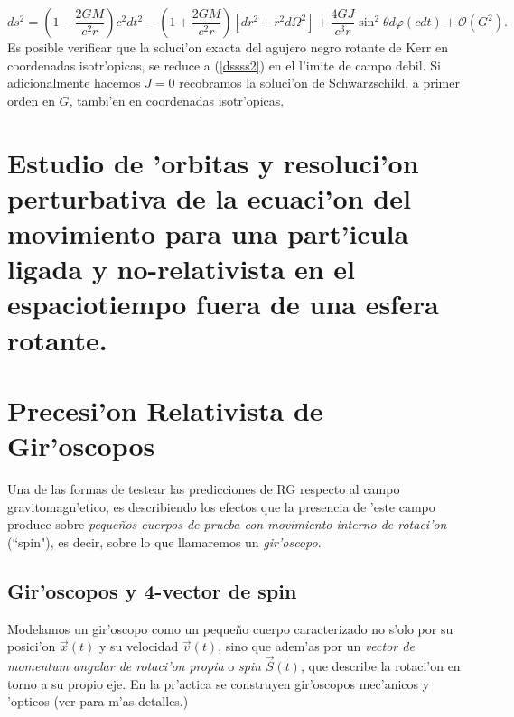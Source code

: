 \begin{equation}\boxed{
ds^2=\left(1-\frac{2GM}{c^2r}\right)c^2dt^2-\left(1+\frac{2GM}{c^2r}\right)\left[dr^2+r^2d\Omega^2\right]+\frac{4GJ}{c^3r}\sin^2 \theta d\varphi (cdt)+\mathcal{O}(G^2).}\label{dssss2}
\end{equation}
Es posible verificar que la soluci'on exacta del agujero negro rotante de Kerr en coordenadas isotr'opicas, se reduce a (\ref{dssss2}) en el l'imite de campo debil. Si adicionalmente hacemos $J=0$ recobramos la soluci'on de Schwarzschild, a primer orden en $G$, tambi'en en coordenadas isotr'opicas.

\section{Estudio de 'orbitas y resoluci'on perturbativa de la ecuaci'on del movimiento para una part'icula ligada y no-relativista en el espaciotiempo fuera de una esfera rotante.}

\section{Precesi'on Relativista de Gir'oscopos}

Una de las formas de testear las predicciones de RG respecto al campo gravitomagn'etico, es describiendo los efectos que la presencia de 'este campo produce sobre \textit{peque\~nos cuerpos de prueba con movimiento interno de rotaci'on} (``spin"), es decir, sobre lo que llamaremos un \textit{gir'oscopo}.

\subsection{Gir'oscopos y 4-vector de spin}

Modelamos un gir'oscopo como un peque\~no cuerpo caracterizado no s'olo por %
su posici'on $\vec{x}(t)$ y su velocidad $\vec{v}(t)$, sino que adem'as por un \textit{vector de momentum angular de rotaci'on propia} o \textit{spin} $\vec{S}(t)$, que describe la rotaci'on en torno a su propio eje. En la pr'actica se construyen gir'oscopos mec'anicos y 'opticos (ver \cite{1} para m'as detalles.)

